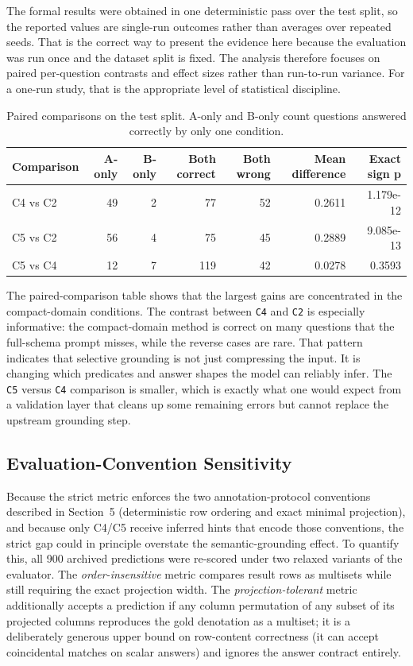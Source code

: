 \documentclass{ieeeaccess}
\begin{document}
The formal results were obtained in one deterministic pass over the test split, so the reported values are single-run outcomes rather than averages over repeated seeds. That is the correct way to present the evidence here because the evaluation was run once and the dataset split is fixed. The analysis therefore focuses on paired per-question contrasts and effect sizes rather than run-to-run variance. For a one-run study, that is the appropriate level of statistical discipline.

\begin{table}[t]
\caption{Paired comparisons on the test split. A-only and B-only count questions answered correctly by only one condition.}
\centering
\small
\begin{tabular*}{\textwidth}{@{\extracolsep{\fill}}lrrrrrr}
\toprule
Comparison & A-only & B-only & Both correct & Both wrong & Mean difference & Exact sign p \\
\midrule
C4 vs C2 & 49 & 2 & 77 & 52 & 0.2611 & 1.179e-12 \\
C5 vs C2 & 56 & 4 & 75 & 45 & 0.2889 & 9.085e-13 \\
C5 vs C4 & 12 & 7 & 119 & 42 & 0.0278 & 0.3593 \\
\bottomrule
\end{tabular*}
\end{table}

The paired-comparison table shows that the largest gains are concentrated in the compact-domain conditions. The contrast between \texttt{C4} and \texttt{C2} is especially informative: the compact-domain method is correct on many questions that the full-schema prompt misses, while the reverse cases are rare. That pattern indicates that selective grounding is not just compressing the input. It is changing which predicates and answer shapes the model can reliably infer. The \texttt{C5} versus \texttt{C4} comparison is smaller, which is exactly what one would expect from a validation layer that cleans up some remaining errors but cannot replace the upstream grounding step.

\subsection{Evaluation-Convention Sensitivity}\label{evaluation-convention-sensitivity}

Because the strict metric enforces the two annotation-protocol conventions described in Section~5 (deterministic row ordering and exact minimal projection), and because only C4/C5 receive inferred hints that encode those conventions, the strict gap could in principle overstate the semantic-grounding effect. To quantify this, all 900 archived predictions were re-scored under two relaxed variants of the evaluator. The \emph{order-insensitive} metric compares result rows as multisets while still requiring the exact projection width. The \emph{projection-tolerant} metric additionally accepts a prediction if any column permutation of any subset of its projected columns reproduces the gold denotation as a multiset; it is a deliberately generous upper bound on row-content correctness (it can accept coincidental matches on scalar answers) and ignores the answer contract entirely.
\end{document}

